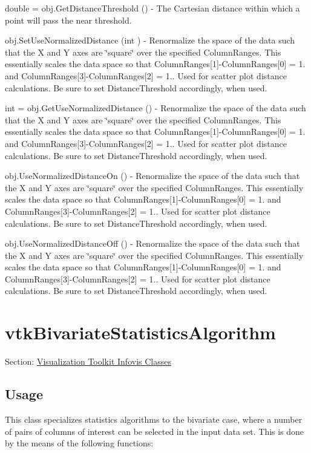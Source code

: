 \begin{DoxyItemize}
\item {\ttfamily double = obj.\-Get\-Distance\-Threshold ()} -\/ The Cartesian distance within which a point will pass the near threshold.  
\item {\ttfamily obj.\-Set\-Use\-Normalized\-Distance (int )} -\/ Renormalize the space of the data such that the X and Y axes are \char`\"{}square\char`\"{} over the specified Column\-Ranges. This essentially scales the data space so that Column\-Ranges\mbox{[}1\mbox{]}-\/\-Column\-Ranges\mbox{[}0\mbox{]} = 1. and Column\-Ranges\mbox{[}3\mbox{]}-\/\-Column\-Ranges\mbox{[}2\mbox{]} = 1.. Used for scatter plot distance calculations. Be sure to set Distance\-Threshold accordingly, when used.  
\item {\ttfamily int = obj.\-Get\-Use\-Normalized\-Distance ()} -\/ Renormalize the space of the data such that the X and Y axes are \char`\"{}square\char`\"{} over the specified Column\-Ranges. This essentially scales the data space so that Column\-Ranges\mbox{[}1\mbox{]}-\/\-Column\-Ranges\mbox{[}0\mbox{]} = 1. and Column\-Ranges\mbox{[}3\mbox{]}-\/\-Column\-Ranges\mbox{[}2\mbox{]} = 1.. Used for scatter plot distance calculations. Be sure to set Distance\-Threshold accordingly, when used.  
\item {\ttfamily obj.\-Use\-Normalized\-Distance\-On ()} -\/ Renormalize the space of the data such that the X and Y axes are \char`\"{}square\char`\"{} over the specified Column\-Ranges. This essentially scales the data space so that Column\-Ranges\mbox{[}1\mbox{]}-\/\-Column\-Ranges\mbox{[}0\mbox{]} = 1. and Column\-Ranges\mbox{[}3\mbox{]}-\/\-Column\-Ranges\mbox{[}2\mbox{]} = 1.. Used for scatter plot distance calculations. Be sure to set Distance\-Threshold accordingly, when used.  
\item {\ttfamily obj.\-Use\-Normalized\-Distance\-Off ()} -\/ Renormalize the space of the data such that the X and Y axes are \char`\"{}square\char`\"{} over the specified Column\-Ranges. This essentially scales the data space so that Column\-Ranges\mbox{[}1\mbox{]}-\/\-Column\-Ranges\mbox{[}0\mbox{]} = 1. and Column\-Ranges\mbox{[}3\mbox{]}-\/\-Column\-Ranges\mbox{[}2\mbox{]} = 1.. Used for scatter plot distance calculations. Be sure to set Distance\-Threshold accordingly, when used.  
\end{DoxyItemize}\hypertarget{vtkinfovis_vtkbivariatestatisticsalgorithm}{}\section{vtk\-Bivariate\-Statistics\-Algorithm}\label{vtkinfovis_vtkbivariatestatisticsalgorithm}
Section\-: \hyperlink{sec_vtkinfovis}{Visualization Toolkit Infovis Classes} \hypertarget{vtkwidgets_vtkxyplotwidget_Usage}{}\subsection{Usage}\label{vtkwidgets_vtkxyplotwidget_Usage}
This class specializes statistics algorithms to the bivariate case, where a number of pairs of columns of interest can be selected in the input data set. This is done by the means of the following functions\-:


